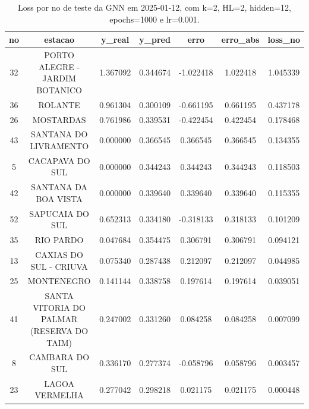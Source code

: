 \begin{table}[h]
\centering
\caption{Loss por no de teste da GNN em 2025-01-12, com k=2, HL=2, hidden=12, epochs=1000 e lr=0.001.}
\label{tab:gnn_loss_k2_hl2_h12_e1000_d20250112}
\begin{tabular}{ccccccc}
\toprule
no & estacao & y\_real & y\_pred & erro & erro\_abs & loss\_no \\
\midrule
32 & PORTO ALEGRE - JARDIM BOTANICO & 1.367092 & 0.344674 & -1.022418 & 1.022418 & 1.045339 \\
36 & ROLANTE & 0.961304 & 0.300109 & -0.661195 & 0.661195 & 0.437178 \\
26 & MOSTARDAS & 0.761986 & 0.339531 & -0.422454 & 0.422454 & 0.178468 \\
43 & SANTANA DO LIVRAMENTO & 0.000000 & 0.366545 & 0.366545 & 0.366545 & 0.134355 \\
5 & CACAPAVA DO SUL & 0.000000 & 0.344243 & 0.344243 & 0.344243 & 0.118503 \\
42 & SANTANA DA BOA VISTA & 0.000000 & 0.339640 & 0.339640 & 0.339640 & 0.115355 \\
52 & SAPUCAIA DO SUL & 0.652313 & 0.334180 & -0.318133 & 0.318133 & 0.101209 \\
35 & RIO PARDO & 0.047684 & 0.354475 & 0.306791 & 0.306791 & 0.094121 \\
13 & CAXIAS DO SUL - CRIUVA & 0.075340 & 0.287438 & 0.212097 & 0.212097 & 0.044985 \\
25 & MONTENEGRO & 0.141144 & 0.338758 & 0.197614 & 0.197614 & 0.039051 \\
41 & SANTA VITORIA DO PALMAR (RESERVA DO TAIM) & 0.247002 & 0.331260 & 0.084258 & 0.084258 & 0.007099 \\
8 & CAMBARA DO SUL & 0.336170 & 0.277374 & -0.058796 & 0.058796 & 0.003457 \\
23 & LAGOA VERMELHA & 0.277042 & 0.298218 & 0.021175 & 0.021175 & 0.000448 \\
\bottomrule
\end{tabular}
\end{table}
